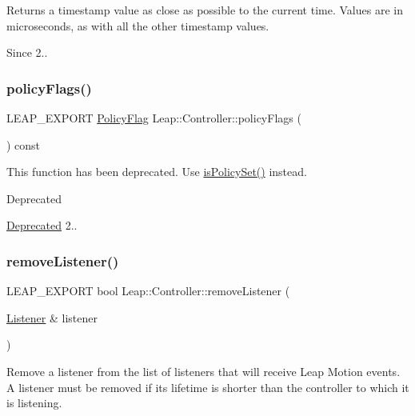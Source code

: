 Returns a timestamp value as close as possible to the current time. Values are in microseconds, as with all the other timestamp values.

\begin{DoxySince}{Since}
2.. 
\end{DoxySince}
\mbox{\label{class_leap_1_1_controller_a5861fb4c3b26cb48bc12a3e9cc9eaf93}} 
\subsubsection{\texorpdfstring{policy\+Flags()}{policyFlags()}}
{\footnotesize\ttfamily L\+E\+A\+P\+\_\+\+E\+X\+P\+O\+RT \hyperlink{class_leap_1_1_controller_a0bdb49fa94aa2da8b098c1ac296528d6}{Policy\+Flag} Leap\+::\+Controller\+::policy\+Flags (\begin{DoxyParamCaption}{ }\end{DoxyParamCaption}) const}

This function has been deprecated. Use \hyperlink{class_leap_1_1_controller_a75bfba23a30619a3514fa1d654b4df29}{is\+Policy\+Set()} instead. \begin{DoxyRefDesc}{Deprecated}
\item[\hyperlink{deprecated__deprecated000004}{Deprecated}]2.. \end{DoxyRefDesc}
\mbox{\label{class_leap_1_1_controller_a1a48d46f317f0368cc8f7b0ebfd77728}} 
\subsubsection{\texorpdfstring{remove\+Listener()}{removeListener()}}
{\footnotesize\ttfamily L\+E\+A\+P\+\_\+\+E\+X\+P\+O\+RT bool Leap\+::\+Controller\+::remove\+Listener (\begin{DoxyParamCaption}\item[{\hyperlink{class_leap_1_1_listener}{Listener} \&}]{listener }\end{DoxyParamCaption})}

Remove a listener from the list of listeners that will receive Leap Motion events. A listener must be removed if its lifetime is shorter than the controller to which it is listening.


